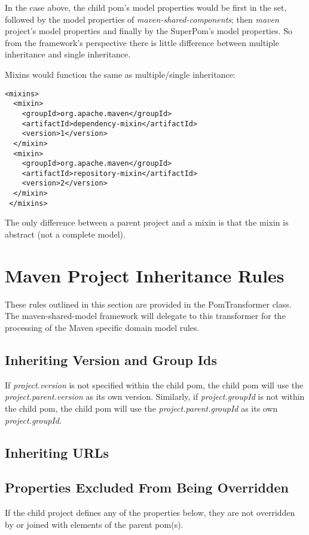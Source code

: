 \documentclass[12pt]{amsart}
\begin{document}
In the case above, the child pom's model properties would be first in the set, followed by the model properties of \emph{maven-shared-components}; then \emph{maven} project's model properties and finally by the SuperPom's model properties. So from the framework's perspective there is little difference between multiple inheritance and single inheritance.

Mixins would function the same as multiple/single inheritance:

\begin{verbatim}
<mixins>
  <mixin>
    <groupId>org.apache.maven</groupId>
    <artifactId>dependency-mixin</artifactId>
    <version>1</version>
  </mixin>
  <mixin>
    <groupId>org.apache.maven</groupId>
    <artifactId>repository-mixin</artifactId>
    <version>2</version>
  </mixin>
 </mixins>
\end{verbatim}

The only difference between a parent project and a mixin is that the mixin is abstract (not a complete model).

\section{Maven Project Inheritance Rules}
These rules outlined in this section are provided in the PomTransformer class. The maven-shared-model framework will delegate to this transformer for the processing of the Maven specific domain model rules.

\subsection{Inheriting Version and Group Ids}
If \emph{project.version} is not specified within the child pom, the child pom will use the \emph{project.parent.version} as its own version. Similarly, if \emph{project.groupId} is not within the child pom, the child pom will use the \emph{project.parent.groupId} as its own \emph{project.groupId}.

\subsection{Inheriting URLs}

\subsection{Properties Excluded From Being Overridden}
If the child project defines any of the properties below, they are not overridden by or joined with elements of the parent pom(s). 
\end{document}
